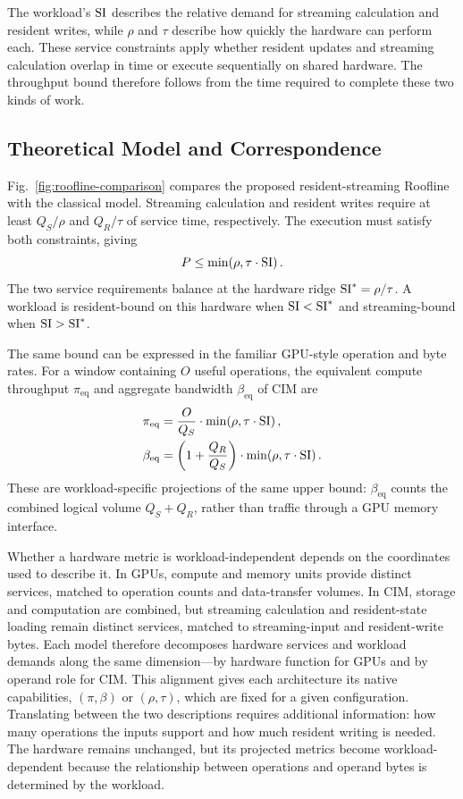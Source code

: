 The workload's $\mathrm{SI}$ describes the relative demand for streaming calculation and resident writes, while $\rho$ and $\tau$ describe how quickly the hardware can perform each. These service constraints apply whether resident updates and streaming calculation overlap in time or execute sequentially on shared hardware. The throughput bound therefore follows from the time required to complete these two kinds of work.

\paperplacefigtwo

\subsection{Theoretical Model and Correspondence}
Fig.~\ref{fig:roofline-comparison} compares the proposed resident-streaming Roofline with the classical model. Streaming calculation and resident writes require at least $Q_S/\rho$ and $Q_R/\tau$ of service time, respectively. The execution must satisfy both constraints, giving
\begin{equation}
  P\leq\min\!\left(\rho,\tau\cdot\mathrm{SI}\right).
  \label{eq:roofline}
\end{equation}
The two service requirements balance at the hardware ridge $\mathrm{SI}^*=\rho/\tau$. A workload is resident-bound on this hardware when $\mathrm{SI}<\mathrm{SI}^*$ and streaming-bound when $\mathrm{SI}>\mathrm{SI}^*$.

The same bound can be expressed in the familiar GPU-style operation and byte rates. For a window containing $O$ useful operations, the equivalent compute throughput $\pi_{\mathrm{eq}}$ and aggregate bandwidth $\beta_{\mathrm{eq}}$ of CIM are
\begin{align}
  \pi_{\mathrm{eq}}
    &=\frac{O}{Q_S}\cdot
      \min\!\left(\rho,\tau\cdot\mathrm{SI}\right),
      \label{eq:equivalent-compute}\\
  \beta_{\mathrm{eq}}
    &=\left(1+\frac{Q_R}{Q_S}\right)\cdot
      \min\!\left(\rho,\tau\cdot\mathrm{SI}\right).
      \label{eq:equivalent-bandwidth}
\end{align}
These are workload-specific projections of the same upper bound: $\beta_{\mathrm{eq}}$ counts the combined logical volume $Q_S+Q_R$, rather than traffic through a GPU memory interface.

Whether a hardware metric is workload-independent depends on the coordinates used to describe it. In GPUs, compute and memory units provide distinct services, matched to operation counts and data-transfer volumes. In CIM, storage and computation are combined, but streaming calculation and resident-state loading remain distinct services, matched to streaming-input and resident-write bytes. Each model therefore decomposes hardware services and workload demands along the same dimension---by hardware function for GPUs and by operand role for CIM. This alignment gives each architecture its native capabilities, $(\pi,\beta)$ or $(\rho,\tau)$, which are fixed for a given configuration. Translating between the two descriptions requires additional information: how many operations the inputs support and how much resident writing is needed. The hardware remains unchanged, but its projected metrics become workload-dependent because the relationship between operations and operand bytes is determined by the workload.

